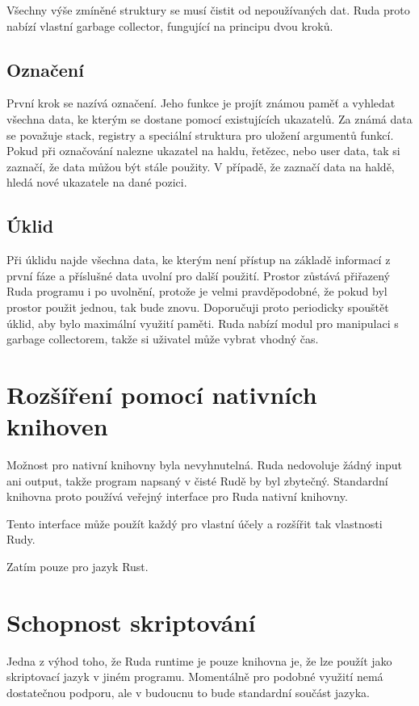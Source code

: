 \documentclass[12pt, a4paper,
twoside,        %
openright
]{report}
\begin{document}
	Všechny výše zmíněné struktury se musí čistit od nepoužívaných dat. Ruda proto nabízí vlastní garbage collector, fungující na principu dvou kroků.
	
	\subsection{Označení}
	
	První krok se nazívá označení. Jeho funkce je projít známou paměť a vyhledat všechna data, ke kterým se dostane pomocí existujících ukazatelů. Za známá data se považuje stack, registry a speciální struktura pro uložení argumentů funkcí. Pokud při označování nalezne ukazatel na haldu, řetězec, nebo user data, tak si zaznačí, že data můžou být stále použity. V případě, že zaznačí data na haldě, hledá nové ukazatele na dané pozici.
	
	\subsection{Úklid}
	
	Při úklidu najde všechna data, ke kterým není přístup na základě informací z první fáze a příslušné data uvolní pro další použití. Prostor zůstává přiřazený Ruda programu i po uvolnění, protože je velmi pravděpodobné, že pokud byl prostor použit jednou, tak bude znovu. Doporučuji proto periodicky spouštět úklid, aby bylo maximální využití paměti. Ruda nabízí modul pro manipulaci s garbage collectorem, takže si uživatel může vybrat vhodný čas.
	
	\section{Rozšíření pomocí nativních knihoven}
	
	Možnost pro nativní knihovny byla nevyhnutelná. Ruda nedovoluje žádný input ani output, takže program napsaný v čisté Rudě by byl zbytečný. Standardní knihovna proto používá veřejný interface pro Ruda nativní knihovny. 
	
	Tento interface může použít každý pro vlastní účely a rozšířit tak vlastnosti Rudy.
	
	Zatím pouze pro jazyk Rust.
	
	\section{Schopnost skriptování}
	
	Jedna z výhod toho, že Ruda runtime je pouze knihovna je, že lze použít jako skriptovací jazyk v jiném programu. Momentálně pro podobné využití nemá dostatečnou podporu, ale v budoucnu to bude standardní součást jazyka.
	
\end{document}
